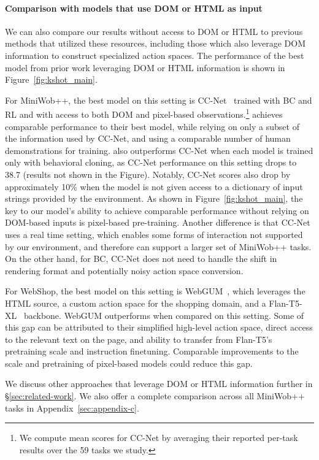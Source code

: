 \paragraph{Comparison with models that use DOM or HTML as input} We can also compare our results without access to DOM or HTML to previous methods that utilized these resources, including those which also leverage DOM information to construct specialized action spaces. The performance of the best model from prior work leveraging DOM or HTML information is shown in Figure~\ref{fig:kshot_main}.

For MiniWob++, the best model on this setting is CC-Net~\citep{humphreys2022data} trained with BC and RL and with access to both DOM and pixel-based observations.\footnote{We compute mean scores for CC-Net by averaging their reported per-task results over the 59 tasks we study.} 
\ours achieves comparable performance to their best model, while relying on only a subset of the information used by CC-Net, and using a comparable number of human demonstrations for training.
\ours also outperforms CC-Net when each model is trained only with behavioral cloning, as CC-Net performance on this setting drops to 38.7 (results not shown in the Figure). Notably, CC-Net scores also drop by approximately 10\% when the model is not given access to a dictionary of input strings provided by the environment. As shown in Figure~\ref{fig:kshot_main}, the key to our model's ability to achieve comparable performance without relying on DOM-based inputs is pixel-based pre-training. Another difference is that CC-Net uses a real time setting, which enables some forms of interaction not supported by our environment, and therefore can support a larger set of MiniWob++ tasks. On the other hand, for BC, CC-Net does not need to handle the shift in rendering format and potentially noisy action space conversion. 

For WebShop, the best model on this setting is WebGUM~\citep{furuta2023instruction}, which leverages the HTML source,
a custom action space for the shopping domain, and a Flan-T5-XL~\citep{chung2022scaling} backbone.
WebGUM outperforms \ours when compared on this setting. Some of this gap can be attributed to their simplified high-level action space, direct access to the relevant text on the page, and ability to transfer from Flan-T5's pretraining scale and instruction finetuning. Comparable improvements to the scale and pretraining of pixel-based models could reduce this gap.


We discuss other approaches that leverage DOM or HTML information further in \S\ref{sec:related-work}. We also offer a complete comparison across all MiniWob++ tasks in Appendix~\ref{sec:appendix-c}.

